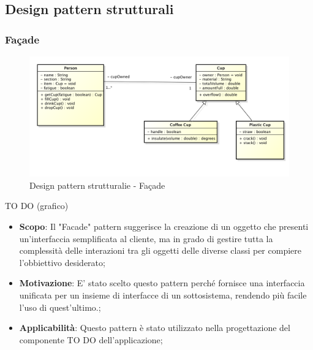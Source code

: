 


	\clearpage 
	\newpage
	\subsection{Design pattern strutturali} %
		\subsubsection{Fa\c{c}ade} %
		
		
		\begin{figure}[htbp]
			\centering
			\centerline{\includegraphics[scale=0.3]{./images/example_graph.png}}
			\caption{Design pattern strutturalie - Fa\c{c}ade}
		\end{figure}
		TO DO (grafico)
		
		
		\begin{itemize}
			\item \textbf{Scopo}: Il "Facade" pattern suggerisce la creazione di un oggetto che presenti un'interfaccia semplificata al cliente, ma in grado di gestire tutta la complessità delle interazioni tra gli oggetti delle diverse classi per compiere l'obbiettivo desiderato;
			
			\item \textbf{Motivazione}: E' stato scelto questo pattern perché fornisce una interfaccia unificata per un insieme di interfacce di un sottosistema, rendendo più facile l'uso di quest'ultimo.;
			
			\item \textbf{Applicabilità}: Questo pattern è stato utilizzato nella progettazione del componente TO DO dell'applicazione;
			
		\end{itemize}



